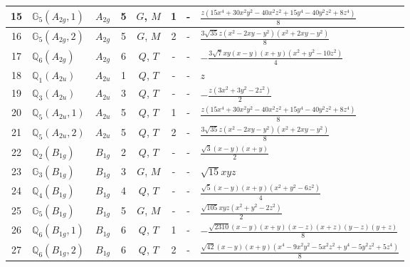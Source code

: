 \documentclass[fleqn,10pt,landscape]{jsarticle}
\begin{document}
\begin{longtable}[l]{clcccccl}
15 & $\mathbb{G}_{5}(A_{2g},1)$ & $A_{2g}$ & 5 & $G$, $M$ & 1 & - & $\frac{z \left(15 x^{4} + 30 x^{2} y^{2} - 40 x^{2} z^{2} + 15 y^{4} - 40 y^{2} z^{2} + 8 z^{4}\right)}{8}$ \\ \hline
16 & $\mathbb{G}_{5}(A_{2g},2)$ & $A_{2g}$ & 5 & $G$, $M$ & 2 & - & $\frac{3 \sqrt{35} z \left(x^{2} - 2 x y - y^{2}\right) \left(x^{2} + 2 x y - y^{2}\right)}{8}$ \\ \hline
17 & $\mathbb{Q}_{6}(A_{2g})$ & $A_{2g}$ & 6 & $Q$, $T$ & - & - & $- \frac{3 \sqrt{7} x y \left(x - y\right) \left(x + y\right) \left(x^{2} + y^{2} - 10 z^{2}\right)}{4}$ \\ \hline
18 & $\mathbb{Q}_{1}(A_{2u})$ & $A_{2u}$ & 1 & $Q$, $T$ & - & - & $z$ \\ \hline
19 & $\mathbb{Q}_{3}(A_{2u})$ & $A_{2u}$ & 3 & $Q$, $T$ & - & - & $- \frac{z \left(3 x^{2} + 3 y^{2} - 2 z^{2}\right)}{2}$ \\ \hline
20 & $\mathbb{Q}_{5}(A_{2u},1)$ & $A_{2u}$ & 5 & $Q$, $T$ & 1 & - & $\frac{z \left(15 x^{4} + 30 x^{2} y^{2} - 40 x^{2} z^{2} + 15 y^{4} - 40 y^{2} z^{2} + 8 z^{4}\right)}{8}$ \\ \hline
21 & $\mathbb{Q}_{5}(A_{2u},2)$ & $A_{2u}$ & 5 & $Q$, $T$ & 2 & - & $\frac{3 \sqrt{35} z \left(x^{2} - 2 x y - y^{2}\right) \left(x^{2} + 2 x y - y^{2}\right)}{8}$ \\ \hline
22 & $\mathbb{Q}_{2}(B_{1g})$ & $B_{1g}$ & 2 & $Q$, $T$ & - & - & $\frac{\sqrt{3} \left(x - y\right) \left(x + y\right)}{2}$ \\ \hline
23 & $\mathbb{G}_{3}(B_{1g})$ & $B_{1g}$ & 3 & $G$, $M$ & - & - & $\sqrt{15} x y z$ \\ \hline
24 & $\mathbb{Q}_{4}(B_{1g})$ & $B_{1g}$ & 4 & $Q$, $T$ & - & - & $\frac{\sqrt{5} \left(x - y\right) \left(x + y\right) \left(x^{2} + y^{2} - 6 z^{2}\right)}{4}$ \\ \hline
25 & $\mathbb{G}_{5}(B_{1g})$ & $B_{1g}$ & 5 & $G$, $M$ & - & - & $\frac{\sqrt{105} x y z \left(x^{2} + y^{2} - 2 z^{2}\right)}{2}$ \\ \hline
26 & $\mathbb{Q}_{6}(B_{1g},1)$ & $B_{1g}$ & 6 & $Q$, $T$ & 1 & - & $- \frac{\sqrt{2310} \left(x - y\right) \left(x + y\right) \left(x - z\right) \left(x + z\right) \left(y - z\right) \left(y + z\right)}{8}$ \\ \hline
27 & $\mathbb{Q}_{6}(B_{1g},2)$ & $B_{1g}$ & 6 & $Q$, $T$ & 2 & - & $\frac{\sqrt{42} \left(x - y\right) \left(x + y\right) \left(x^{4} - 9 x^{2} y^{2} - 5 x^{2} z^{2} + y^{4} - 5 y^{2} z^{2} + 5 z^{4}\right)}{8}$ \\ \hline

\end{longtable}
\end{document}
